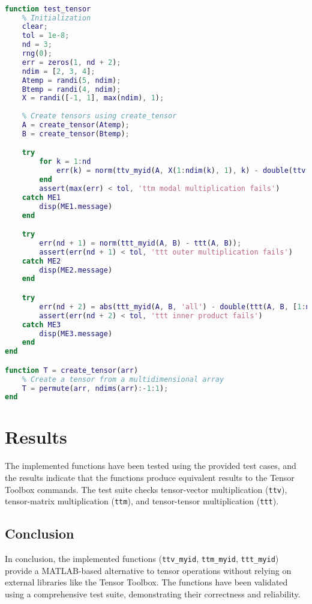 \begin{center}
    \begin{lstlisting}[language=MATLAB, caption=Test Tensor funciton ]
    %%main file

function test_tensor
    % Initialization
    clear; 
    tol = 1e-8;
    nd = 3;
    rng(0);
    err = zeros(1, nd + 2);
    ndim = [2, 3, 4];
    Atemp = randi(5, ndim);
    Btemp = randi(4, ndim);
    X = randi([-1, 1], max(ndim), 1);
    
    % Create tensors using create_tensor
    A = create_tensor(Atemp);
    B = create_tensor(Btemp);

    try
        for k = 1:nd
            err(k) = norm(ttv_myid(A, X(1:ndim(k), 1), k) - double(ttv(A, X(1:ndim(k), 1), k)));
        end
        assert(max(err) < tol, 'ttm modal multiplication fails')
    catch ME1
        disp(ME1.message)
    end

    try
        err(nd + 1) = norm(ttt_myid(A, B) - ttt(A, B));
        assert(err(nd + 1) < tol, 'ttt outer multiplication fails')
    catch ME2
        disp(ME2.message)
    end

    try
        err(nd + 2) = abs(ttt_myid(A, B, 'all') - double(ttt(A, B, [1:nd])));
        assert(err(nd + 2) < tol, 'ttt inner product fails')
    catch ME3
        disp(ME3.message)
    end
end

function T = create_tensor(arr)
    % Create a tensor from a multidimensional array
    T = permute(arr, ndims(arr):-1:1);
end

    \end{lstlisting}
\end{center}

\section*{Results}

The implemented functions have been tested using the provided test cases, and the results indicate that the functions produce equivalent results to the Tensor Toolbox commands. The test suite checks tensor-vector multiplication (\texttt{ttv}), tensor-matrix multiplication (\texttt{ttm}), and tensor-tensor multiplication (\texttt{ttt}).

\subsection*{Conclusion}

In conclusion, the implemented functions (\texttt{ttv\_myid}, \texttt{ttm\_myid}, \texttt{ttt\_myid}) provide a MATLAB-based alternative to tensor operations without relying on external libraries like the Tensor Toolbox. The functions have been validated using a comprehensive test suite, demonstrating their correctness and reliability.

